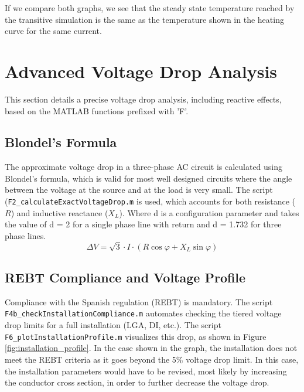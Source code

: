 \documentclass[12pt, a4paper]{article}
\begin{document}
If we compare both graphs, we see that the steady state temperature reached by the transitive simulation is the same as the temperature shown in the heating curve for the same current.





\newpage
\section{Advanced Voltage Drop Analysis}
This section details a precise voltage drop analysis, including reactive effects, based on the MATLAB functions prefixed with 'F'.

\subsection{Blondel's Formula}
The approximate voltage drop in a three-phase AC circuit is calculated using Blondel's formula, which is valid for most well designed circuits where the angle between the voltage at the source and at the load is very small. The script (\texttt{F2\_calculateExactVoltageDrop.m} is used, which accounts for both resistance ($R$) and inductive reactance ($X_L$). Where d is a configuration parameter and takes the value of d = 2 for a single phase line with return and d = 1.732 for three phase lines.
\begin{equation}
    \Delta V = \sqrt{3} \cdot I \cdot (R \cos\varphi + X_L \sin\varphi)
\end{equation}

    
    
    
    
    
    
    
    
    
    
    
    
\subsection{REBT Compliance and Voltage Profile}
Compliance with the Spanish regulation (REBT) is mandatory. The script \texttt{F4b\_checkInstallationCompliance.m} automates checking the tiered voltage drop limits for a full installation (LGA, DI, etc.). The script \texttt{F6\_plotInstallationProfile.m} visualizes this drop, as shown in Figure \ref{fig:installation_profile}.
In the case shown in the graph, the installation does not meet the REBT criteria as it goes beyond the 5\% voltage drop limit. In this case, the installation parameters would have to be revised, most likely by increasing the conductor cross section, in order to further decrease the voltage drop. 
\end{document}
